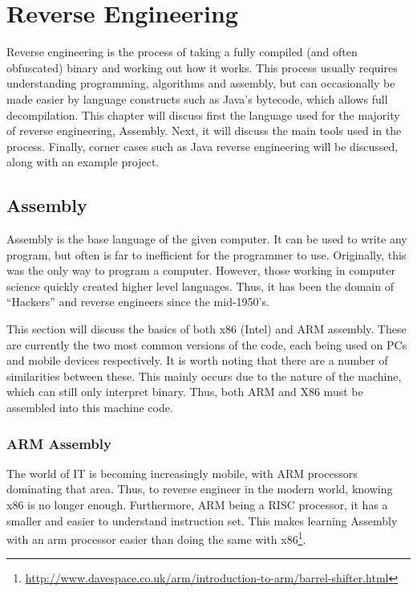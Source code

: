 \chapter{Reverse Engineering}
	\label{ch:ReverseEngineering}
	Reverse engineering is the process of taking a fully compiled (and often obfuscated) binary and working out how it works. 
	This process usually requires understanding programming, algorithms and assembly, but can occasionally be made easier by language constructs such as Java's bytecode, which allows full decompilation. 
	This chapter will discuss first the language used for the majority of reverse engineering, Assembly. 
	Next, it will discuss the main tools used in the process. 
	Finally, corner cases such as Java reverse engineering will be discussed, along with an example project. 

	\section{Assembly}
		Assembly is the base language of the given computer. 
		It can be used to write any program, but often is far to inefficient for the programmer to use. 
		Originally, this was the only way to program a computer. 
		However, those working in computer science quickly created higher level languages. 
		Thus, it has been the domain of ``Hackers'' and reverse engineers since the mid-1950's. 

		This section will discuss the basics of both x86 (Intel) and ARM assembly. 
		These are currently the two most common versions of the code, each being used on PCs and mobile devices respectively. 
		It is worth noting that there are a number of similarities between these. 
		This mainly occurs due to the nature of the machine, which can still only interpret binary. 
		Thus, both ARM and X86 must be assembled into this machine code. 
		\subsection{ARM Assembly}
			The world of IT is becoming increasingly mobile, with ARM processors dominating that area. 
			Thus, to reverse engineer in the modern world, knowing x86 is no longer enough. 
			Furthermore, ARM being a RISC processor, it has a smaller and easier to understand instruction set. 
			This makes learning Assembly with an arm processor easier than doing the same with x86\footnote{\url{http://www.davespace.co.uk/arm/introduction-to-arm/barrel-shifter.html}}. 

